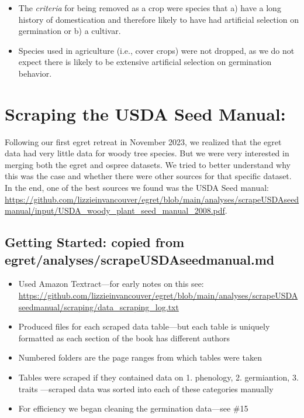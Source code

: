 \documentclass{article}[12pt]
\begin{document}
\begin{enumerate}
\begin{itemize}
\begin{itemize}
\item The \emph{criteria} for being removed as a crop were species that a) have a long history of domestication and therefore likely to have had artificial selection on germination or b) a cultivar.
\item Species used in agriculture (i.e., cover crops) were not dropped, as we do not expect there is likely to be extensive artificial selection on germination behavior.
\end{itemize}
\end{itemize}
\end{enumerate}

\section*{Scraping the USDA Seed Manual: }

Following our first egret retreat in November 2023, we realized that the egret data had very little data for woody tree species. But we were very interested in merging both the egret and ospree datasets. We tried to better understand why this was the case and whether there were other sources for that specific dataset. In the end, one of the best sources we found was the USDA Seed manual: \url{https://github.com/lizzieinvancouver/egret/blob/main/analyses/scrapeUSDAseedmanual/input/USDA_woody_plant_seed_manual_2008.pdf}.

\subsection*{Getting Started: copied from egret/analyses/scrapeUSDAseedmanual.md}
\begin{itemize}
\item Used Amazon Textract---for early notes on this see: \url{https://github.com/lizzieinvancouver/egret/blob/main/analyses/scrapeUSDAseedmanual/scraping/data_scraping_log.txt}
\item Produced files for each scraped data table---but each table is uniquely formatted as each section of the book has different authors
\item Numbered folders are the page ranges from which tables were taken
\item Tables were scraped if they contained data on 1. phenology, 2. germiantion, 3. traits ---scraped data was sorted into each of these categories manually
\item For efficiency we began cleaning the germination data---see \#15
\end{itemize}
\end{document}
